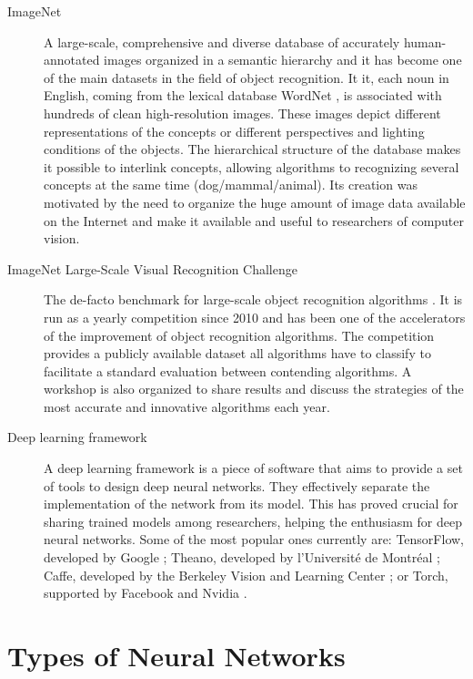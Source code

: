 \begin{description}
  \item[ImageNet]
  A large-scale, comprehensive and diverse database of accurately human-annotated images organized in a semantic hierarchy \cite{Deng2009} and it has become one of the main datasets in the field of object recognition.
  It it, each noun in English, coming from the lexical database WordNet \cite{Wilkniss1998}, is associated with hundreds of clean high-resolution images.
  These images depict different representations of the concepts or different perspectives and lighting conditions of the objects.
  The hierarchical structure of the database makes it possible to interlink concepts, allowing algorithms to recognizing several concepts at the same time (dog/mammal/animal).
  Its creation was motivated by the need to organize the huge amount of image data available on the Internet and make it available and useful to researchers of computer vision.

  \item[ImageNet Large-Scale Visual Recognition Challenge]
  The de-facto benchmark for large-scale object recognition algorithms \cite{Russakovsky2015}.
  It is run as a yearly competition since 2010 and has been one of the accelerators of the improvement of object recognition algorithms.
  The competition provides a publicly available dataset all algorithms have to classify to facilitate a standard evaluation between contending algorithms.
  A workshop is also organized to share results and discuss the strategies of the most accurate and innovative algorithms each year.

  \item[Deep learning framework]
  A deep learning framework is a piece of software that aims to provide a set of tools to design deep neural networks.
  They effectively separate the implementation of the network from its model.
  This has proved crucial for sharing trained models among researchers, helping the enthusiasm for deep neural networks.
  Some of the most popular ones currently are: TensorFlow, developed by Google \cite{Abadi2015}; Theano, developed by l’Université de Montréal \cite{Bergstra2010}; Caffe, developed by the Berkeley Vision and Learning Center \cite{Jia2014}; or Torch, supported by Facebook and Nvidia \cite{Collobert2002}.
\end{description}



\section{Types of Neural Networks}
\label{sec:Types of Neural Networks}

